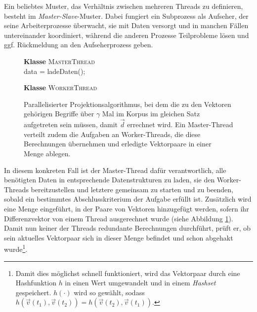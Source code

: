 Ein beliebtes Muster, das Verhältnis zwischen mehreren Threads zu definieren, besteht im \emph{Master-Slave}-Muster.
Dabei fungiert ein Subprozess als Aufseher, der seine Arbeiterprozesse überwacht, sie mit Daten versorgt und in manchen
Fällen untereinander koordiniert, während die anderen Prozesse Teilprobleme lösen und ggf. Rückmeldung an den Aufseherprozess
geben.\\

\begin{figure}[h]
  \centering
  \begin{algorithm}[H]
    \BlankLine
    \textbf{Klasse} \textsc{MasterThread} \\
      data = ladeDaten();\\

    \BlankLine
    \textbf{Klasse} \textsc{WorkerThread} \\
  \end{algorithm}
  \caption[Parallelisierter Projektionsalgorithmus]{Parallelisierter Projektionsalgorithmus, bei dem die zu den Vektoren gehörigen
  Begriffe über $\gamma$ Mal im Korpus im gleichen Satz aufgetreten sein müssen, damit $\vec{d}$ errechnet wird. Ein Master-Thread
  verteilt zudem die Aufgaben an Worker-Threads, die diese Berechnungen übernehmen und erledigte Vektorpaare in einer Menge ablegen.
  \label{fig:algo3}}
\end{figure}

In diesem konkreten Fall ist der Master-Thread dafür verantwortlich, alle benötigten Daten in entsprechende Datenstrukturen
zu laden, sie den Worker-Threads bereitzustellen und letztere gemeinsam zu starten und zu beenden, sobald ein bestimmtes
Abschlusskriterium der Aufgabe erfüllt ist.
Zusätzlich wird eine Menge eingeführt, in der Paare von Vektoren hinzugefügt werden, sofern
ihr Differenzvektor von einem Thread ausgerechnet wurde (siehe Abbildung \ref{fig:algo3}). Damit nun keiner der Threads redundante Berechnungen durchführt, prüft er, ob sein
aktuelles Vektorpaar sich in dieser Menge befindet und schon abgehakt wurde\footnote{Damit dies möglichst schnell funktioniert,
wird das Vektorpaar durch eine Hashfunktion $h$ in einen Wert umgewandelt und in einem \emph{Hashset} gespeichert. $h(\cdot)$ wird so gewählt,
sodass $h(\vec{v}(t_1), \vec{v}(t_2)) = h(\vec{v}(t_2), \vec{v}(t_1))$.}.\\

